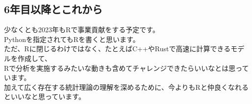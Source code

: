 \documentclass[
  letterpaper,
  DIV=11,
  numbers=noendperiod]{scrartcl}
\begin{document}
\hypertarget{ux5e74ux76eeux4ee5ux964dux3068ux3053ux308cux304bux3089}{%
\subsection{6年目以降とこれから}\label{ux5e74ux76eeux4ee5ux964dux3068ux3053ux308cux304bux3089}}

少なくとも2023年もRで事業貢献をする予定です。\\
Pythonを指定されてもRを書くと思います。\\
ただ、Rに閉じるわけではなく、たとえばC++やRustで高速に計算できるモデルを作成して、\\
Rで分析を実施するみたいな動きも含めてチャレンジできたらいいなとは思っています。\\
加えて広く存在する統計理論の理解を深めるために、今よりもRと仲良くなれるといいなと思っています。
\end{document}
